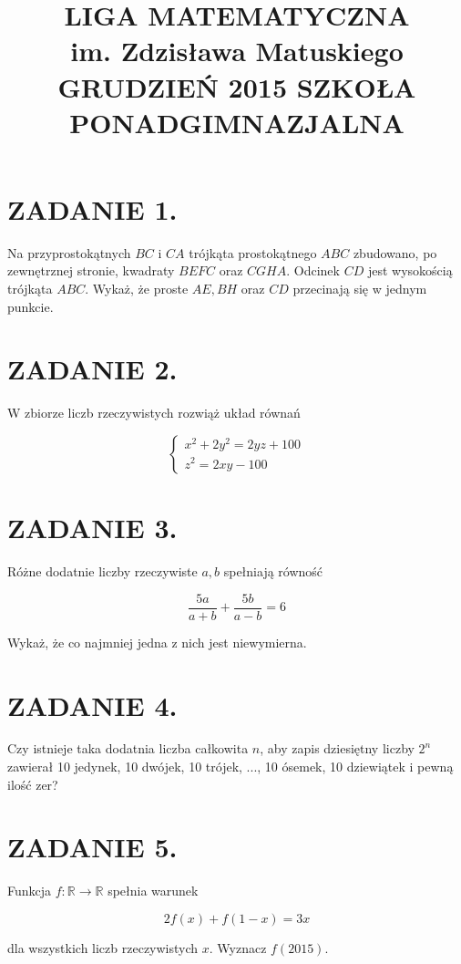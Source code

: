 \documentclass[10pt]{article}
\title{LIGA MATEMATYCZNA \\
 im. Zdzisława Matuskiego GRUDZIEŃ 2015 SZKOŁA PONADGIMNAZJALNA }
\author{}
\date{}
\begin{document}
\maketitle
\section*{ZADANIE 1.}
Na przyprostokątnych \(B C\) i \(C A\) trójkąta prostokątnego \(A B C\) zbudowano, po zewnętrznej stronie, kwadraty \(B E F C\) oraz \(C G H A\). Odcinek \(C D\) jest wysokością trójkąta \(A B C\). Wykaż, że proste \(A E, B H\) oraz \(C D\) przecinają się w jednym punkcie.

\section*{ZADANIE 2.}
W zbiorze liczb rzeczywistych rozwiąż układ równań

\[
\left\{\begin{array}{l}
x^{2}+2 y^{2}=2 y z+100 \\
z^{2}=2 x y-100
\end{array}\right.
\]

\section*{ZADANIE 3.}
Różne dodatnie liczby rzeczywiste \(a, b\) spełniają równość

\[
\frac{5 a}{a+b}+\frac{5 b}{a-b}=6
\]

Wykaż, że co najmniej jedna z nich jest niewymierna.

\section*{ZADANIE 4.}
Czy istnieje taka dodatnia liczba całkowita \(n\), aby zapis dziesiętny liczby \(2^{n}\) zawierał 10 jedynek, 10 dwójek, 10 trójek, ..., 10 ósemek, 10 dziewiątek i pewną ilość zer?

\section*{ZADANIE 5.}
Funkcja \(f: \mathbb{R} \rightarrow \mathbb{R}\) spełnia warunek

\[
2 f(x)+f(1-x)=3 x
\]

dla wszystkich liczb rzeczywistych \(x\). Wyznacz \(f(2015)\).
\end{document}
